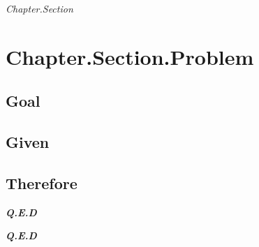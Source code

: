\documentclass{article}
\begin{document}
\newpage

\begin{center}
\begin{frame}{}
  \centering \Huge
  \emph{Chapter.Section}
\end{frame}    
\end{center}

\newpage



\newpage
\setcounter{section}{0}
\section{Chapter.Section.Problem}
\subsection{Goal}
\subsection{Given}
\subsection{Therefore}
\textbf{\textit{Q.E.D}}



\textbf{\textit{Q.E.D}}
\end{document}
